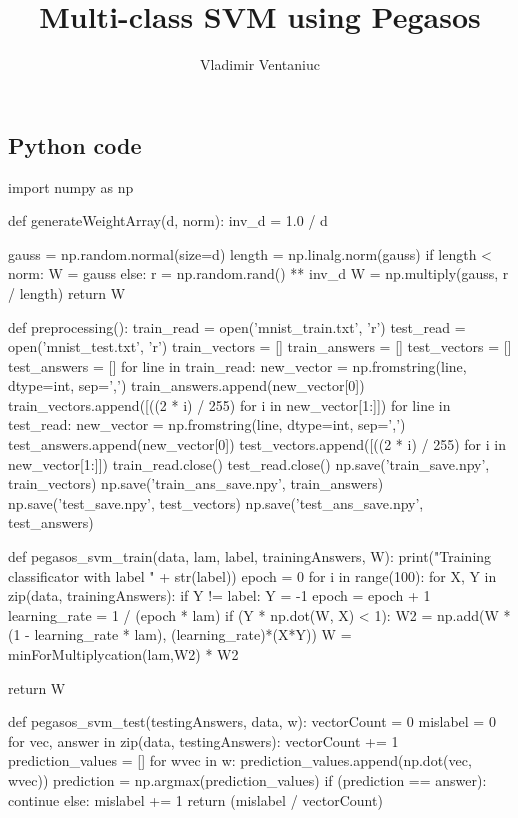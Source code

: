 \documentclass[a4paper,12pt]{article}
\title{Multi-class SVM using Pegasos}
\author{Vladimir Ventaniuc}
\begin{document}
\maketitle

\subsection*{Python code}
\begin{python}
import numpy as np

def generateWeightArray(d, norm):
    inv_d = 1.0 / d

    gauss = np.random.normal(size=d)
    length = np.linalg.norm(gauss)
    if length < norm:
        W = gauss
    else:
        r = np.random.rand() ** inv_d
        W = np.multiply(gauss, r / length)
    return W

def preprocessing():
    train_read = open('mnist_train.txt', 'r')
    test_read = open('mnist_test.txt', 'r')
    train_vectors = []
    train_answers = []
    test_vectors = []
    test_answers = []
    for line in train_read:
        new_vector = np.fromstring(line, dtype=int, sep=',')
        train_answers.append(new_vector[0])
        train_vectors.append([((2 * i) / 255) for i in new_vector[1:]])
    for line in test_read:
        new_vector = np.fromstring(line, dtype=int, sep=',')
        test_answers.append(new_vector[0])
        test_vectors.append([((2 * i) / 255) for i in new_vector[1:]])
    train_read.close()
    test_read.close()
    np.save('train_save.npy', train_vectors)
    np.save('train_ans_save.npy', train_answers)
    np.save('test_save.npy', test_vectors)
    np.save('test_ans_save.npy', test_answers)


def pegasos_svm_train(data, lam, label, trainingAnswers, W):
    print("Training classificator with label " + str(label))
    epoch = 0
    for i in range(100):
        for X, Y in zip(data, trainingAnswers):
            if Y != label:
                Y = -1
            epoch = epoch + 1
            learning_rate = 1 / (epoch * lam)
            if (Y * np.dot(W, X) < 1):
                W2 = np.add(W * (1 - learning_rate * lam), (learning_rate)*(X*Y))
                W = minForMultiplycation(lam,W2) * W2
           
    return W

def pegasos_svm_test(testingAnswers, data, w):
    vectorCount = 0
    mislabel = 0
    for vec, answer in zip(data, testingAnswers):
        vectorCount += 1
        prediction_values = []
        for wvec in w:
            prediction_values.append(np.dot(vec, wvec))
        prediction = np.argmax(prediction_values)
        if (prediction == answer):
            continue
        else:
            mislabel += 1
    return (mislabel / vectorCount)


\end{python}
\end{document}
